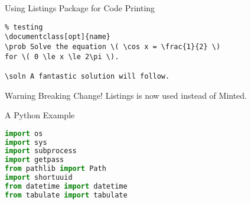 \documentclass[\string~/GitHub/sthlmNordBeamerTheme/sthlmNordLightDemo.tex]{subfiles}
\begin{document}
\begin{frame}{Using Listings Package for Code Printing}

\begin{lstlisting}
% testing
\documentclass[opt]{name}
\prob Solve the equation \( \cos x = \frac{1}{2} \)
for \( 0 \le x \le 2\pi \).

\soln A fantastic solution will follow.
\end{lstlisting}

\begin{alertblock}{Warning}
  Breaking Change!  Listings is now used instead of Minted.
\end{alertblock}
\end{frame}


\begin{frame}{A Python Example}

\begin{lstlisting}[language={python}]
import os
import sys
import subprocess
import getpass
from pathlib import Path
import shortuuid
from datetime import datetime
from tabulate import tabulate
\end{lstlisting}
\end{frame}
\end{document}
